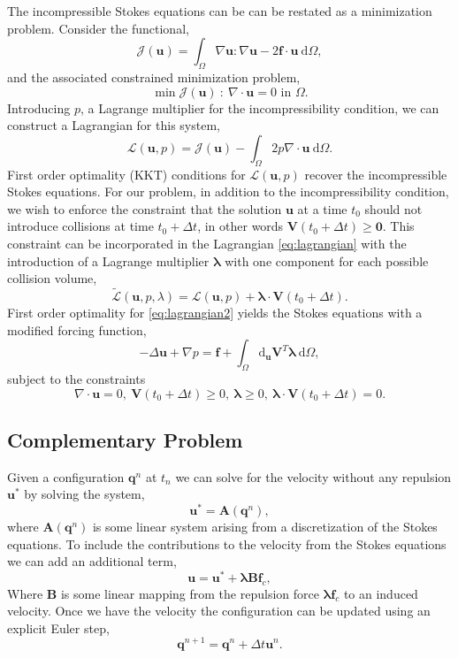 \documentclass[preprint, 10pt]{elsarticle}
\begin{document}
The incompressible Stokes equations can be can be restated as a minimization problem. Consider the functional,
\[ \mathcal{J}(\mathbf{u}) = \int_{\Omega} \nabla\mathbf{u}:\nabla\mathbf{u} - 2\mathbf{f}\cdot\mathbf{u} ~\text{d}\Omega,\]
and the associated constrained minimization problem,
\[ \min \mathcal{J}(\mathbf{u}) ~:~ \nabla\cdot\mathbf{u} = 0 \text{ in }\Omega.\]
Introducing $p$, a Lagrange multiplier for the incompressibility condition, we can construct a Lagrangian for this system,
\begin{equation}\label{eq:lagrangian} \mathcal{L}(\mathbf{u},p) = \mathcal{J}(\mathbf{u}) - \int_{\Omega} 2p\nabla\cdot\mathbf{u}~\text{d}\Omega.\end{equation}
First order optimality (KKT) conditions for $\mathcal{L}(\mathbf{u},p)$ recover the incompressible Stokes equations. For our problem, in addition to the incompressibility condition, we wish to enforce the constraint that the solution $\mathbf{u}$ at a time $t_0$ should not introduce collisions at time $t_0+\Delta t$, in other words $\mathbf{V}(t_0 + \Delta t) \geq \mathbf{0}$.
This constraint can be incorporated in the Lagrangian \eqref{eq:lagrangian} with the introduction of a Lagrange multiplier $\pmb{\lambda}$ with one component for each possible collision volume,
\begin{equation}\label{eq:lagrangian2} \tilde{\mathcal{L}}(\mathbf{u},p,\lambda) = \mathcal{L}(\mathbf{u},p) + \pmb{\lambda} \cdot \mathbf{V}(t_0+\Delta t).\end{equation}
First order optimality for \eqref{eq:lagrangian2} yields the Stokes equations with a modified forcing function,
\begin{equation}\label{eq:stokes_mod}-\Delta \mathbf{u} + \nabla p = \mathbf{f} + \int_{\Omega} \text{d}_{\mathbf{u}} \mathbf{V}^T\pmb{\lambda} ~\text{d}\Omega,\end{equation}
subject to the constraints
\[\nabla\cdot\mathbf{u}  =0, ~\mathbf{V}(t_0 + \Delta t) \geq 0,~\pmb{\lambda} \geq 0, ~ \pmb{\lambda}\cdot\mathbf{V}(t_0+\Delta t) = 0.	\]

\subsection{Complementary Problem}

Given a configuration $\mathbf{q}^n$ at $t_n$ we can solve for the velocity without any repulsion $\mathbf{u}^*$ by solving the system,
\[ \mathbf{u}^* = \mathbf{A}(\mathbf{q}^n),\]
where $\mathbf{A}(\mathbf{q}^n)$ is some linear system arising from a discretization of the Stokes equations. To include the contributions to the velocity from the Stokes equations we can add an additional term,
\[ \mathbf{u} = \mathbf{u}^* + \pmb{\lambda} \mathbf{B} \mathbf{f}_c,\]
Where $\mathbf{B}$ is some linear mapping from the repulsion force $\pmb{\lambda}\mathbf{f}_c$ to an induced velocity. Once we have the velocity the configuration can be updated using an explicit Euler step,
\[ \mathbf{q}^{n+1} = \mathbf{q}^n + \Delta t\mathbf{u}^n.\]
\end{document}
